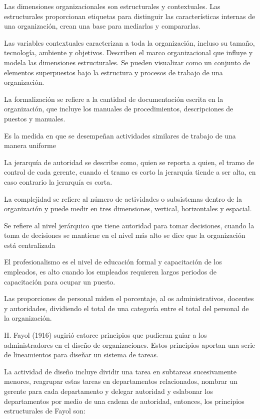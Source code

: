 Las dimensiones organizacionales son estructurales y contextuales. Las estructurales proporcionan etiquetas para distinguir las características internas de una organización, crean una base para mediarlas y compararlas.

Las variables contextuales caracterizan a toda la organización, incluso su tamaño, tecnología, ambiente y objetivos. Describen el marco organizacional que influye y modela las dimensiones estructurales. Se pueden visualizar como un conjunto de elementos superpuestos bajo la estructura y procesos de trabajo de una organización.

La formalización se refiere a la cantidad de documentación escrita en la organización, que incluye los manuales de procedimientos, descripciones de puestos y manuales.

\begin{definition}[Estandarización]
    Es la medida en que se desempeñan actividades similares de trabajo de una manera uniforme
\end{definition}
La jerarquía de autoridad se describe como, quien se reporta a quien, el tramo de control de cada gerente, cuando el tramo es corto la jerarquía tiende a ser alta, en caso contrario la jerarquía es corta.

La complejidad se refiere al número de actividades o subsistemas dentro de la organización y puede medir en tres dimensiones, vertical, horizontales y espacial.

\begin{definition}[Centralización]
    Se refiere al nivel jerárquico que tiene autoridad para tomar decisiones, cuando la toma de decisiones se mantiene en el nivel más alto se dice que la organización está centralizada
\end{definition}

El profesionalismo es el nivel de educación formal y capacitación de los empleados, es alto cuando los empleados requieren largos periodos de capacitación para ocupar un puesto.

Las proporciones de personal miden el porcentaje, al os administrativos, docentes y autoridades, dividiendo el total de una categoría entre el total del personal de la organización.

H. Fayol (1916) sugirió catorce principios que pudieran guiar a los administradores en el diseño de organizaciones. Estos principios aportan una serie de lineamientos para diseñar un sistema de tareas.

La actividad de diseño incluye dividir una tarea en subtareas sucesivamente menores, reagrupar estas tareas en departamentos relacionados, nombrar un gerente para cada departamento y delegar autoridad y eslabonar los departamentos por medio de una cadena de autoridad, entonces, los principios estructurales de Fayol son:

